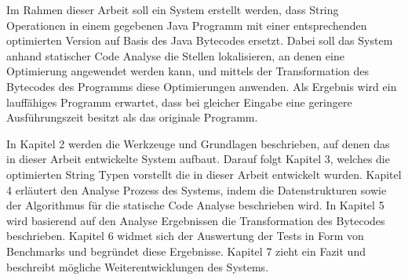 Im Rahmen dieser Arbeit soll ein System erstellt werden, dass String Operationen in einem
gegebenen Java Programm mit einer entsprechenden optimierten Version auf Basis des 
Java Bytecodes ersetzt. Dabei soll das System anhand statischer Code Analyse die Stellen
lokalisieren, an denen eine Optimierung angewendet werden kann, und mittels der Transformation des 
Bytecodes des Programms diese Optimierungen anwenden. Als Ergebnis wird ein lauffähiges
Programm erwartet, dass bei gleicher Eingabe eine geringere Ausführungszeit besitzt 
als das originale Programm.

In Kapitel 2 werden die Werkzeuge und Grundlagen beschrieben, auf denen das in dieser Arbeit
entwickelte System aufbaut. Darauf folgt Kapitel 3, welches die optimierten String Typen vorstellt
die in dieser Arbeit entwickelt wurden. Kapitel 4 erläutert den Analyse Prozess des Systems, indem
die Datenstrukturen sowie der Algorithmus für die statische Code Analyse beschrieben wird.
In Kapitel 5 wird basierend auf den Analyse Ergebnissen die Transformation des Bytecodes 
beschrieben. Kapitel 6 widmet sich der Auswertung der Tests in Form von Benchmarks
und begründet diese Ergebnisse. Kapitel 7 zieht ein Fazit und beschreibt mögliche
Weiterentwicklungen des Systems.    